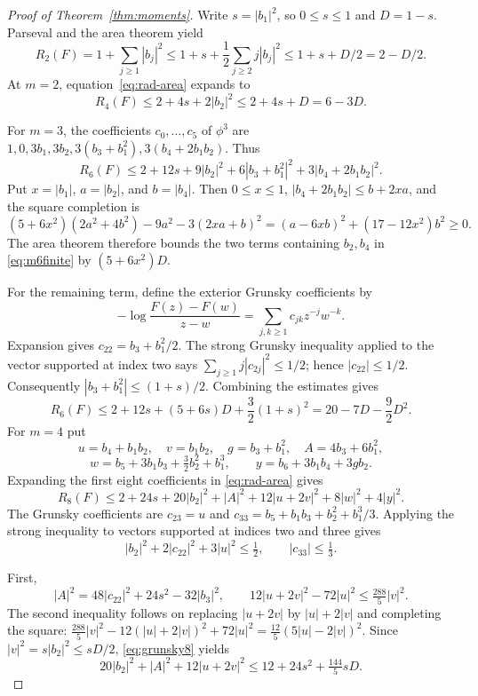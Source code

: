 \documentclass[11pt]{article}
\begin{document}
	\begin{proof}[Proof of Theorem~\ref{thm:moments}]
		Write $s=|b_1|^2$, so $0\le s\le1$ and $D=1-s$. Parseval and the area
		theorem yield
		\[
		R_2(F)=1+\sum_{j\ge1}|b_j|^2
		\le1+s+\frac12\sum_{j\ge2}j|b_j|^2
		\le1+s+D/2=2-D/2.
		\]
		At $m=2$, equation~\eqref{eq:rad-area} expands to
		\[
		R_4(F)\le2+4s+2|b_2|^2\le2+4s+D=6-3D.
		\]
		
		For $m=3$, the coefficients $c_0,\ldots,c_5$ of $\phi^3$ are
		$1,0,3b_1,3b_2,3(b_3+b_1^2),3(b_4+2b_1b_2)$. Thus
		\begin{equation}\label{eq:m6finite}
			R_6(F)\le2+12s+9|b_2|^2+6|b_3+b_1^2|^2
			+3|b_4+2b_1b_2|^2.
		\end{equation}
		Put $x=|b_1|$, $a=|b_2|$, and $b=|b_4|$. Then $0\le x\le1$,
		$|b_4+2b_1b_2|\le b+2xa$, and the square completion is
		\[
		(5+6x^2)(2a^2+4b^2)-9a^2-3(2xa+b)^2
		=(a-6xb)^2+(17-12x^2)b^2\ge0.
		\]
		The area theorem therefore bounds the two terms containing $b_2,b_4$
		in \eqref{eq:m6finite} by $(5+6x^2)D$.
		
		For the remaining term, define the exterior Grunsky coefficients by
		\[
		-\log\frac{F(z)-F(w)}{z-w}
		=\sum_{j,k\ge1}c_{jk}z^{-j}w^{-k}.
		\]
		Expansion gives $c_{22}=b_3+b_1^2/2$. The strong Grunsky inequality
		applied to the vector supported at index two says
		$\sum_{j\ge1}j|c_{2j}|^2\le1/2$; hence $|c_{22}|\le1/2$.
		Consequently $|b_3+b_1^2|\le(1+s)/2$. Combining the estimates gives
		\[
		R_6(F)\le2+12s+(5+6s)D+\frac32(1+s)^2
		=20-7D-\frac92D^2.
		\]
		For $m=4$ put
		\[
		u=b_4+b_1b_2,\quad v=b_1b_2,\quad g=b_3+b_1^2,
		\quad A=4b_3+6b_1^2,
		\]
		\[
		w=b_5+3b_1b_3+\tfrac32b_2^2+b_1^3,
		\qquad y=b_6+3b_1b_4+3gb_2.
		\]
		Expanding the first eight coefficients in \eqref{eq:rad-area} gives
		\begin{equation}\label{eq:m8finite}
			R_8(F)\le2+24s+20|b_2|^2+|A|^2
			+12|u+2v|^2+8|w|^2+4|y|^2.
		\end{equation}
		The Grunsky coefficients are $c_{23}=u$ and
		$c_{33}=b_5+b_1b_3+b_2^2+b_1^3/3$.
		Applying the strong inequality to vectors supported at indices two
		and three gives
		\begin{equation}\label{eq:grunsky8}
			|b_2|^2+2|c_{22}|^2+3|u|^2\le\tfrac12,
			\qquad |c_{33}|\le\tfrac13.
		\end{equation}
		
		First,
		\[
		|A|^2=48|c_{22}|^2+24s^2-32|b_3|^2,
		\qquad
		12|u+2v|^2-72|u|^2\le\tfrac{288}{5}|v|^2.
		\]
		The second inequality follows on replacing $|u+2v|$ by
		$|u|+2|v|$ and completing the square:
		$\frac{288}{5}|v|^2-12(|u|+2|v|)^2+72|u|^2
		=\frac{12}{5}(5|u|-2|v|)^2$.
		Since $|v|^2=s|b_2|^2\le sD/2$, \eqref{eq:grunsky8} yields
		\begin{equation}\label{eq:firstblock}
			20|b_2|^2+|A|^2+12|u+2v|^2
			\le12+24s^2+\tfrac{144}{5}sD.
		\end{equation}
		

\end{proof}
\end{document}
